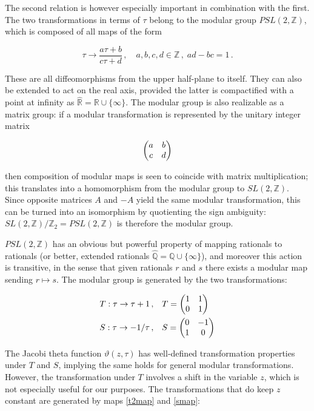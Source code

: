 \documentclass{article}
\begin{document}
\newcommand{\modg}{PSL(2,\mathbb{Z})}

The second relation is however especially important in combination with the first. The two transformations in terms of $\tau$ belong to the modular group $\modg$, which is composed of all maps of the form

\begin{equation}
    \tau \rightarrow \frac{a \tau + b}{c\tau + d}\,, \quad a,b,c,d \in \mathbb{Z}\,,\; ad - bc = 1\,.
\end{equation}

These are all diffeomorphisms from the upper half-plane to itself. They can also be extended to act on the real axis, provided the latter is compactified with a point at infinity as $\hat{\mathbb{R}} = \mathbb{R} \cup \{\infty\}$. The modular group is also realizable as a matrix group: if a modular transformation is represented by the unitary integer matrix

\begin{equation}
    \mqty( a & b \\ c & d)
\end{equation}

then composition of modular maps is seen to coincide with matrix multiplication; this translates into a homomorphism from the modular group to $SL(2,\mathbb{Z})$. Since opposite matrices $A$ and $-A$ yield the same modular transformation, this can be turned into an isomorphism by quotienting the sign ambiguity: $SL(2,\mathbb{Z})/\mathbb{Z}_2 = PSL(2,\mathbb{Z})$ is therefore the modular group.

$\modg$ has an obvious but powerful property of mapping rationals to rationals (or better, extended rationals $\hat{\mathbb{Q}} = \mathbb{Q} \cup \{\infty\}$), and moreover this action is transitive, in the sense that given rationals $r$ and $s$ there exists a modular map sending $r\mapsto s$. The modular group is generated by the two transformations:

\begin{align}
   && T : \tau \rightarrow \tau + 1\,, \quad& T=\mqty(1 & 1 \\ 0 & 1) && \\
   && S : \tau \rightarrow -1/\tau\,, \quad& S=\mqty(0 & -1 \\ 1 & 0) &&
\end{align}

The Jacobi theta function $\vartheta(z,\tau)$ has well-defined transformation properties under $T$ and $S$, implying the same holds for general modular transformations. However, the transformation under $T$ involves a shift in the variable $z$, which is not especially useful for our purposes. The transformations that do keep $z$ constant are generated by maps \eqref{t2map} and \eqref{smap}:
\end{document}
